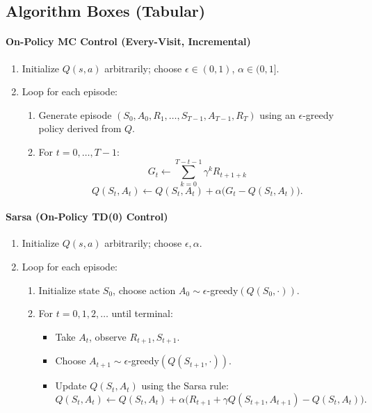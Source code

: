\documentclass[12pt]{article}
\begin{document}
\subsection{Algorithm Boxes (Tabular)}
\paragraph{On-Policy MC Control (Every-Visit, Incremental)}
\begin{enumerate}
    \item Initialize $Q(s,a)$ arbitrarily; choose $\epsilon \in (0,1)$, $\alpha \in (0,1]$.
    \item Loop for each episode:
    \begin{enumerate}
        \item Generate episode $(S_0,A_0,R_1,\dots,S_{T-1},A_{T-1},R_T)$ using an $\epsilon$-greedy policy derived from $Q$.
        \item For $t=0,\dots,T-1$:
        $$
        G_t \leftarrow \sum_{k=0}^{T-t-1} \gamma^k R_{t+1+k}
        $$
        $$
        Q(S_t,A_t) \leftarrow Q(S_t,A_t) + \alpha \bigl(G_t - Q(S_t,A_t)\bigr).
        $$
    \end{enumerate}
\end{enumerate}

\paragraph{Sarsa (On-Policy TD(0) Control)}
\begin{enumerate}
    \item Initialize $Q(s,a)$ arbitrarily; choose $\epsilon, \alpha$.
    \item Loop for each episode:
    \begin{enumerate}
        \item Initialize state $S_0$, choose action $A_0 \sim \epsilon$-greedy$(Q(S_0,\cdot))$.
        \item For $t=0,1,2,\dots$ until terminal:
        \begin{itemize}
            \item Take $A_t$, observe $R_{t+1}, S_{t+1}$.
            \item Choose $A_{t+1} \sim \epsilon$-greedy$(Q(S_{t+1},\cdot))$.
            \item Update $Q(S_t,A_t)$ using the Sarsa rule:
            $$
            Q(S_t,A_t) \leftarrow Q(S_t,A_t) + \alpha \bigl(R_{t+1} + \gamma Q(S_{t+1},A_{t+1}) - Q(S_t,A_t)\bigr).
            $$
        \end{itemize}
    \end{enumerate}
\end{enumerate}
\end{document}
